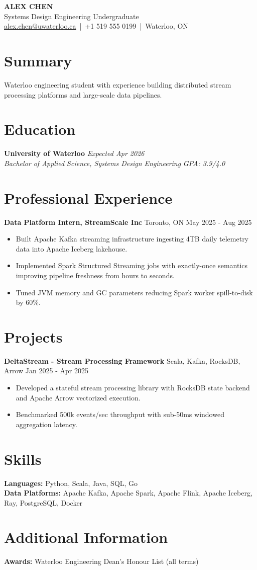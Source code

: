 \documentclass[10pt]{article}
\newcommand{\experienceitem}[4]{\textbf{#1} #2 #3 #4}
\newcommand{\projectitem}[4]{\textbf{#1} #2 #3 #4}
\begin{document}
\begin{center}
{\Large \textbf{ALEX CHEN}}\\
{\normalsize Systems Design Engineering Undergraduate}\\
\href{mailto:alex.chen@uwaterloo.ca}{alex.chen@uwaterloo.ca} \,|\, +1 519 555 0199 \,|\, Waterloo, ON
\end{center}
\section{Summary}
Waterloo engineering student with experience building distributed stream processing platforms and large-scale data pipelines.
\section{Education}
\noindent\textbf{University of Waterloo} \hfill \textit{Expected Apr 2026}\\
\textit{Bachelor of Applied Science, Systems Design Engineering} \hfill \textit{GPA: 3.9/4.0}
\section{Professional Experience}
\experienceitem{Data Platform Intern, StreamScale Inc}{Toronto, ON}{May 2025 - Aug 2025}{
\begin{itemize}
  \item Built Apache Kafka streaming infrastructure ingesting 4TB daily telemetry data into Apache Iceberg lakehouse.
  \item Implemented Spark Structured Streaming jobs with exactly-once semantics improving pipeline freshness from hours to seconds.
  \item Tuned JVM memory and GC parameters reducing Spark worker spill-to-disk by 60\%.
\end{itemize}}
\section{Projects}
\projectitem{DeltaStream - Stream Processing Framework}{Scala, Kafka, RocksDB, Arrow}{Jan 2025 - Apr 2025}{
\begin{itemize}
  \item Developed a stateful stream processing library with RocksDB state backend and Apache Arrow vectorized execution.
  \item Benchmarked 500k events/sec throughput with sub-50ms windowed aggregation latency.
\end{itemize}}
\section{Skills}
\noindent\textbf{Languages:} Python, Scala, Java, SQL, Go\\
\textbf{Data Platforms:} Apache Kafka, Apache Spark, Apache Flink, Apache Iceberg, Ray, PostgreSQL, Docker
\section{Additional Information}
\noindent\textbf{Awards:} Waterloo Engineering Dean's Honour List (all terms)\\
\end{document}
